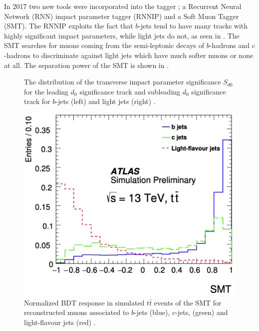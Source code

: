 In 2017 two new tools were incorporated into the tagger
\cite{ATL-PHYS-PUB-2017-013}; a Recurrent Neural Network (RNN) impact parameter
tagger (RNNIP) and a Soft Muon Tagger (SMT).  The RNNIP
\cite{ATL-PHYS-PUB-2017-003} exploits the fact that $b$-jets tend to have many
tracks with highly significant impact parameters, while light jets do not, as
seen in .  The SMT \cite{Sciandra:2287545} searches for
muons coming from the semi-leptonic decays of $b$-hadrons and $c$-hadrons to
discriminate against light jets which have much softer muons or none at all. The
separation power of the SMT is shown in .

\begin{figure}[!htbp]
  \centering
   \hfill

  \caption{The distribution of the transverse impact parameter significance $S_{d0}$ for the leading $d_{0}$ significance track and subleading $d_{0}$ significance track for $b$-jets (left) and light jets (right) \cite{Chisholm:bjet}.}
  \label{sec:objects:RNNIP}
\end{figure}

\begin{figure}[!htbp]
  \centering
  \includegraphics[width=0.5\linewidth]{figures/objects/SMT}
  \caption{Normalized BDT response in simulated $t\bar{t}$ events of the SMT for reconstructed muons associated to $b$-jets (blue), $c$-jets, (green) and light-flavour jets (red) \cite{Chisholm:bjet}.}
  \label{sec:objects:SMT}
\end{figure}


